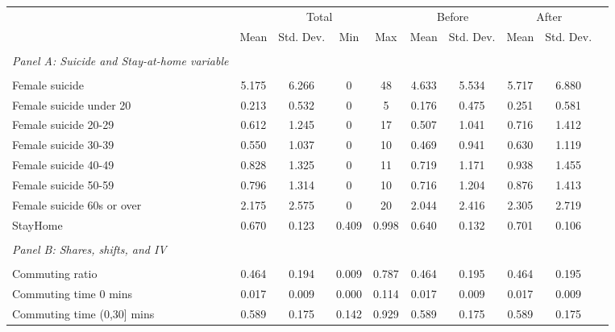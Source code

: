 \begin{tabular}{l*{9}{c}} \toprule
                    &\multicolumn{4}{c}{Total}                          &\multicolumn{2}{c}{Before}&\multicolumn{2}{c}{After}\\\cmidrule(lr){2-5}\cmidrule(lr){6-7}\cmidrule(lr){8-9}
                    &        Mean&   Std. Dev.&         Min&         Max&        Mean&   Std. Dev.&        Mean&   Std. Dev.\\
\hline \\ \multicolumn{1}{l}{\textit{Panel A: Suicide and Stay-at-home variable}} \\\\[-1ex]
Female suicide      &       5.175&       6.266&           0&          48&       4.633&       5.534&       5.717&       6.880\\
Female suicide under 20&       0.213&       0.532&           0&           5&       0.176&       0.475&       0.251&       0.581\\
Female suicide 20-29&       0.612&       1.245&           0&          17&       0.507&       1.041&       0.716&       1.412\\
Female suicide 30-39&       0.550&       1.037&           0&          10&       0.469&       0.941&       0.630&       1.119\\
Female suicide 40-49&       0.828&       1.325&           0&          11&       0.719&       1.171&       0.938&       1.455\\
Female suicide 50-59&       0.796&       1.314&           0&          10&       0.716&       1.204&       0.876&       1.413\\
Female suicide 60s or over&       2.175&       2.575&           0&          20&       2.044&       2.416&       2.305&       2.719\\
StayHome            &       0.670&       0.123&       0.409&       0.998&       0.640&       0.132&       0.701&       0.106\\
\\ \multicolumn{1}{l}{\textit{Panel B: Shares, shifts, and IV}} \\\\[-1ex]
Commuting ratio     &       0.464&       0.194&       0.009&       0.787&       0.464&       0.195&       0.464&       0.195\\
Commuting time 0 mins&       0.017&       0.009&       0.000&       0.114&       0.017&       0.009&       0.017&       0.009\\
Commuting time (0,30] mins&       0.589&       0.175&       0.142&       0.929&       0.589&       0.175&       0.589&       0.175\\

\end{tabular}

